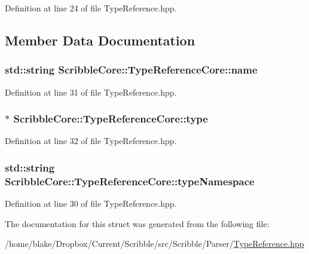 Definition at line 24 of file Type\-Reference.\-hpp.



\subsection{Member Data Documentation}
\hypertarget{struct_scribble_core_1_1_type_reference_core_a0e2f05945e7ee59784a6b61865653df8}{
\subsubsection[{name}]{\setlength{\rightskip}{0pt plus 5cm}std\-::string Scribble\-Core\-::\-Type\-Reference\-Core\-::name}}\label{struct_scribble_core_1_1_type_reference_core_a0e2f05945e7ee59784a6b61865653df8}


Definition at line 31 of file Type\-Reference.\-hpp.

\hypertarget{struct_scribble_core_1_1_type_reference_core_a0e0faeee3a107ae76ebe27c3d678d1a9}{
\subsubsection[{type}]{$\ast$ Scribble\-Core\-::\-Type\-Reference\-Core\-::type}}\label{struct_scribble_core_1_1_type_reference_core_a0e0faeee3a107ae76ebe27c3d678d1a9}


Definition at line 32 of file Type\-Reference.\-hpp.

\hypertarget{struct_scribble_core_1_1_type_reference_core_ac57d9db0ac167c1fdc653985bb4892ca}{
\subsubsection[{type\-Namespace}]{\setlength{\rightskip}{0pt plus 5cm}std\-::string Scribble\-Core\-::\-Type\-Reference\-Core\-::type\-Namespace}}\label{struct_scribble_core_1_1_type_reference_core_ac57d9db0ac167c1fdc653985bb4892ca}


Definition at line 30 of file Type\-Reference.\-hpp.



The documentation for this struct was generated from the following file\-:\begin{DoxyCompactItemize}
\item 
/home/blake/\-Dropbox/\-Current/\-Scribble/src/\-Scribble/\-Parser/\hyperlink{_type_reference_8hpp}{Type\-Reference.\-hpp}\end{DoxyCompactItemize}

